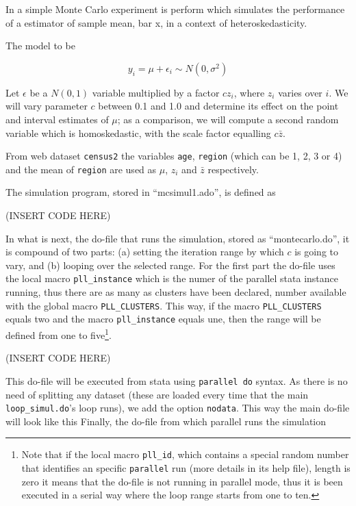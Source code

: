 \documentclass[bib]{statapress}
\begin{document}
In \citet{baum2007} a simple Monte Carlo experiment is perform which simulates the performance of a estimator of sample mean, bar x, in a context of heteroskedasticity.

The model to be

\begin{equation}
y_i = \mu + \epsilon_i \sim N(0,\sigma^2)
\end{equation}

Let $\epsilon$ be a $N(0,1)$ variable multiplied by a factor $cz_i$, where $z_i$ varies over $i$. We will vary parameter $c$ between 0.1 and 1.0 and determine its effect on the point and interval estimates of $\mu$; as a comparison, we will compute a second random variable which is homoskedastic, with the scale factor equalling $c\bar z$.

From web dataset {\tt census2} the variables {\tt age}, {\tt region} (which can be 1, 2, 3 or 4) and the mean of {\tt region} are used as $\mu$, $z_i$ and $\bar z$ respectively.

The simulation program, stored in ``mcsimul1.ado'', is defined as

(INSERT CODE HERE)

In what is next, the do-file that runs the simulation, stored as ``montecarlo.do'', it is compound of two parts: (a) setting the iteration range by which $c$ is going to vary, and (b) looping over the selected range. For the first part the do-file uses the local macro {\tt pll\_instance} which is the numer of the parallel stata instance running, thus there are as many as clusters have been declared, number available with the global macro {\tt PLL\_CLUSTERS}. This way, if the macro {\tt PLL\_CLUSTERS} equals two and the macro {\tt pll\_instance} equals une, then the range will be defined from one to five\footnote{Note that if the local macro {\tt pll\_id}, which contains a special random number that identifies an specific {\tt parallel} run (more details in its help file), length is zero it means that the do-file is not running in parallel mode, thus it is been executed in a serial way where the loop range starts from one to ten.}.
\bigskip

(INSERT CODE HERE)

\noindent This do-file will be executed from stata using {\tt parallel do} syntax. As there is no need of splitting any dataset (these are loaded every time that the main {\tt loop\_simul.do}'s loop runs), we add the option {\tt nodata}. This way the main do-file will look like this
Finally, the do-file from which parallel runs the simulation
\end{document}
